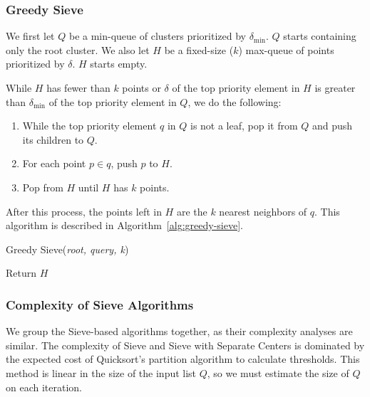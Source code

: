 \subsubsection{Greedy Sieve}
\label{subsubsec:methods:knn-search:greedy-search}

We first let $Q$ be a min-queue of clusters prioritized by $\delta_{\min}$.
$Q$ starts containing only the root cluster.
We also let $H$ be a fixed-size ($k$) max-queue of points prioritized by $\delta$.
$H$ starts empty.

While $H$ has fewer than $k$ points or $\delta$ of the top priority element in $H$ is greater than $\delta_{\min}$ of the top priority element in $Q$, we do the following:

\begin{enumerate}
\item While the top priority element $q$ in $Q$ is not a leaf, pop it from $Q$ and push its children to $Q$.
\item For each point $p \in q$, push $p$ to $H$. 
\item Pop from $H$ until $H$ has $k$ points. 
\end{enumerate}

After this process, the points left in $H$ are the $k$ nearest neighbors of $q$.
This algorithm is described in Algorithm~\ref{alg:greedy-sieve}.

\begin{algorithm} 
\caption{Greedy Sieve(\emph{root, query, k})} 
\label{alg:greedy-sieve} 
\begin{algorithmic}
        \ENDWHILE
        \ENDWHILE
    \ENDWHILE
    \STATE Return $H$
\end{algorithmic}
\end{algorithm}


\subsubsection{Complexity of Sieve Algorithms}
\label{paragraph:methods:sieve-complexity}

We group the Sieve-based algorithms together, as their complexity analyses are similar.
The complexity of Sieve and Sieve with Separate Centers is dominated by the expected cost of Quicksort's partition algorithm to calculate thresholds.
This method is linear in the size of the input list $Q$, so we must estimate the size of $Q$ on each iteration. 

